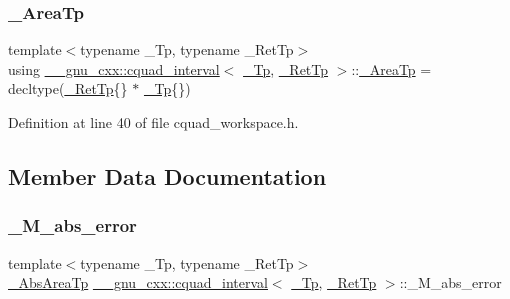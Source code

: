 \subsubsection{\texorpdfstring{\+\_\+\+Area\+Tp}{\_AreaTp}}
{\footnotesize\ttfamily template$<$typename \+\_\+\+Tp, typename \+\_\+\+Ret\+Tp$>$ \\
using \hyperlink{struct____gnu__cxx_1_1cquad__interval}{\+\_\+\+\_\+gnu\+\_\+cxx\+::cquad\+\_\+interval}$<$ \hyperlink{namespace____gnu__cxx_a3b19a9c800ca194374ef9172290f7d79}{\+\_\+\+Tp}, \hyperlink{namespace____gnu__cxx_a886e03ece3d53ff7fa6c098a40f93fa5}{\+\_\+\+Ret\+Tp} $>$\+::\hyperlink{struct____gnu__cxx_1_1cquad__interval_aceac510aa3323d55b31555f96133cb40}{\+\_\+\+Area\+Tp} =  decltype(\hyperlink{namespace____gnu__cxx_a886e03ece3d53ff7fa6c098a40f93fa5}{\+\_\+\+Ret\+Tp}\{\} $\ast$ \hyperlink{namespace____gnu__cxx_a3b19a9c800ca194374ef9172290f7d79}{\+\_\+\+Tp}\{\})}



Definition at line 40 of file cquad\+\_\+workspace.\+h.



\subsection{Member Data Documentation}
\mbox{\label{struct____gnu__cxx_1_1cquad__interval_a63edd4bbb3614217b24256c7a3b305b8}} 
\subsubsection{\texorpdfstring{\+\_\+\+M\+\_\+abs\+\_\+error}{\_M\_abs\_error}}
{\footnotesize\ttfamily template$<$typename \+\_\+\+Tp, typename \+\_\+\+Ret\+Tp$>$ \\
\hyperlink{struct____gnu__cxx_1_1cquad__interval_a3d2a1bbd0064e2a6c6edbcd514585311}{\+\_\+\+Abs\+Area\+Tp} \hyperlink{struct____gnu__cxx_1_1cquad__interval}{\+\_\+\+\_\+gnu\+\_\+cxx\+::cquad\+\_\+interval}$<$ \hyperlink{namespace____gnu__cxx_a3b19a9c800ca194374ef9172290f7d79}{\+\_\+\+Tp}, \hyperlink{namespace____gnu__cxx_a886e03ece3d53ff7fa6c098a40f93fa5}{\+\_\+\+Ret\+Tp} $>$\+::\+\_\+\+M\+\_\+abs\+\_\+error}




